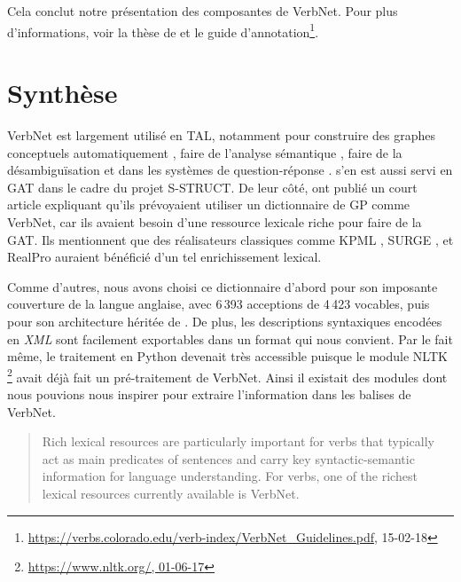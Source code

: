Cela conclut notre présentation des composantes de VerbNet. Pour plus d'informations, voir la thèse de \cite{SchulerVerbnetBroadcoverageComprehensive2005} et le guide d'annotation\footnote{\url{https://verbs.colorado.edu/verb-index/VerbNet_Guidelines.pdf}, 15-02-18}.



\section{Synthèse}

VerbNet est largement utilisé en \ac{TAL}, notamment pour construire des graphes conceptuels automatiquement \citep{HensmanAutomaticallyBuildingConceptual2004}, faire de l'analyse sémantique \citep{Shi:2005:PPT:2132047.2132058}, faire de la désambiguïsation \citep{AbendSupervisedAlgorithmVerb2008} et dans les systèmes de question-réponse \citep{DBLP:conf/nlpke/WenJH08}. \cite{PfeilAlgorithmsResourcesScalable2016} s'en est aussi servi en \ac{GAT} dans le cadre du projet S-STRUCT. De leur côté, \cite{MilleLargeCoverageDetailed2015} ont publié un court article expliquant qu'ils prévoyaient utiliser un dictionnaire de \ac{GP} comme VerbNet, car ils avaient besoin d'une ressource lexicale riche pour faire de la \ac{GAT}. Ils mentionnent que des réalisateurs classiques comme KPML \citep{BatemanEnablingTechnologyMultilingual1997}, SURGE \citep{Elhadad98surge:a}, et RealPro \citep{LavoieFastPortableRealizer1997} auraient bénéficié d'un tel enrichissement lexical.

Comme d'autres, nous avons choisi ce dictionnaire d'abord pour son imposante couverture de la langue anglaise, avec 6\,393 acceptions de 4\,423 vocables, puis pour son architecture héritée de \cite{verb-classes.levin.1993}. De plus, les descriptions syntaxiques encodées en \emph{XML} sont facilement exportables dans un format qui nous convient. Par le fait même, le traitement en Python devenait très accessible puisque le module NLTK \footnote{\url{https://www.nltk.org/, 01-06-17}} avait déjà fait un pré-traitement de VerbNet. Ainsi il existait des modules dont nous pouvions nous inspirer pour extraire l'information dans les balises de VerbNet.

\begin{quote}
Rich lexical resources are particularly important for verbs that typically act as main predicates of sentences and carry key syntactic-semantic information for language understanding. For verbs, one of the richest lexical resources currently available is VerbNet. 
 \end{quote}
 \vspace{-\baselineskip}
 \hfill
 \cite{Majewska2017}

